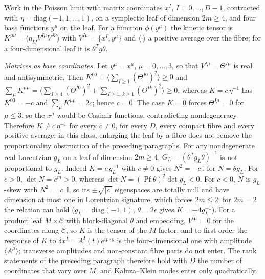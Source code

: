 Work in the Poisson limit with matrix coordinates \(x^I\), \(I=0,\dots,D-1\), contracted with \(\eta=\mathrm{diag}(-1,1,\dots,1)\), on a symplectic leaf of dimension \(2m\ge4\), and four base functions \(y^\mu\) on the leaf. For a function \(\phi(y^\mu)\) the kinetic tensor is \(K^{\mu\nu}=\langle\eta_{IJ}V^{I\mu}V^{J\nu}\rangle\) with \(V^{I\mu}=\{x^I,y^\mu\}\) and \(\langle\cdot\rangle\) a positive average over the fibre; for a four-dimensional leaf it is \(\theta^{T}g\theta\).



\emph{Matrices as base coordinates.} Let \(y^\mu=x^\mu\), \(\mu=0,\dots,3\), so that \(V^{I\mu}=\Theta^{I\mu}\) is real and antisymmetric. Then \(K^{00}=\langle\sum_{I\ge1}(\Theta^{I0})^2\rangle\ge0\) and \(\sum_\mu K^{\mu\mu}=\langle\sum_{I\ge4}(\Theta^{I0})^2+\sum_{I\ge1,\,k\ge1}(\Theta^{Ik})^2\rangle\ge0\), whereas \(K=c\,\eta^{-1}\) has \(K^{00}=-c\) and \(\sum_\mu K^{\mu\mu}=2c\); hence \(c=0\). The case \(K=0\) forces \(\Theta^{I\mu}=0\) for \(\mu\le3\), so the \(x^\mu\) would be Casimir functions, contradicting nondegeneracy. Therefore \(K\ne c\,\eta^{-1}\) for every \(c\ne0\), for every \(D\), every compact fibre and every positive average: in this class, enlarging the leaf by a fibre does not remove the proportionality obstruction of the preceding paragraphs. For any nondegenerate real Lorentzian \(g_L\) on a leaf of dimension \(2m\ge4\), \(G_L=(\theta^{T}g_L\theta)^{-1}\) is not proportional to \(g_L\). Indeed \(K=c\,g_L^{-1}\) with \(c\neq0\) gives \(N^2=-c\,\mathbb I\) for \(N=\theta g_L\). For \(c>0\), \(\det N=c^m>0\), whereas \(\det N=(\operatorname{Pf}\theta)^2\det g_L<0\). For \(c<0\), \(N\) is \(g_L\)-skew with \(N^2=|c|\,\mathbb I\), so its \(\pm\sqrt{|c|}\) eigenspaces are totally null and have dimension at most one in Lorentzian signature, which forces \(2m\le2\); for \(2m=2\) the relation can hold (\(g_L=\mathrm{diag}(-1,1)\), \(\theta=2\epsilon\) gives \(K=-4g_L^{-1}\)). For a product leaf \(M\times\mathcal C\) with block-diagonal \(\theta\) and embedding, \(V^{i\mu}=0\) for the coordinates along \(\mathcal C\), so \(K\) is the tensor of the \(M\) factor, and to first order the response of \(K\) to \(\delta x^I=A^I(t)e^{ip\cdot y}\) is the four-dimensional one with amplitude \(\langle A^\mu\rangle\); transverse amplitudes and non-constant fibre parts do not enter. The rank statements of the preceding paragraph therefore hold with \(D\) the number of coordinates that vary over \(M\), and Kaluza--Klein modes enter only quadratically.



